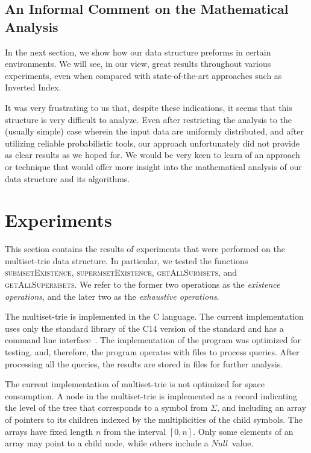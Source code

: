 \documentclass[algorithms,article,accept,pdftex,moreauthors]{Definitions/mdpi}
\newcommand{\CC}{C\nolinebreak\hspace{-.05em}\raisebox{.4ex}{\tiny\bf ++}}
\begin{document}
\subsection{An Informal Comment on the Mathematical Analysis}
In the next section, we show how our data structure preforms in certain environments.
We will see, in our view, great results throughout various experiments, even when compared with state-of-the-art approaches such as Inverted Index.

It was very frustrating to us that, despite these indications, it seems that this structure is very difficult to analyze. 
Even after restricting the analysis to the (usually simple) case wherein the input data are uniformly distributed, and after utilizing reliable probabilistic tools, our approach unfortunately did not provide as clear results as we hoped for. 
We would be very keen to learn of an approach or technique that would offer more insight into the mathematical analysis of our data structure and its algorithms. 




%
\section{Experiments} \label{c:experiments}

%
This section contains the results of experiments that were performed on the multiset-trie 
data structure. In particular, we tested the functions \textsc{submsetExistence}, 
\textsc{supermsetExistence}, \textsc{getAllSubmsets}, and \textsc{getAllSupermsets}. 
We refer to the former two operations as the \emph{existence operations}, and the
later two as the \emph{exhaustive operations}. %

The multiset-trie is implemented in the \CC { programming} language. 
The current implementation uses only the standard library of the \CC14 version of the 
standard and has a command line interface~\cite{akulich2019mstrie}. The implementation of the program was 
optimized for testing, and, therefore, the program operates with files to 
process queries. After processing all the queries, the results are stored in files for further analysis.

The current implementation of multiset-trie is not optimized for space consumption.
A node in the multiset-trie is implemented as a record indicating the level of the tree
that corresponds to a symbol from $\Sigma$, and including an array of pointers to
its children indexed by the multiplicities of the child symbols. The arrays have
fixed length $n$ from the interval $[0,n].$
Only some elements of an array may point to a child node, while others include a
$Null$~value.
\end{document}
